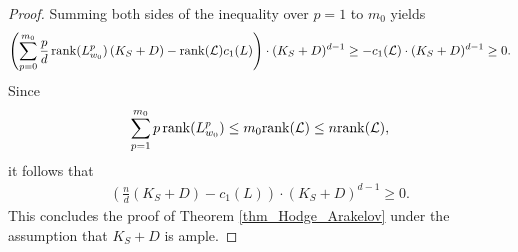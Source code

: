 \documentclass[11pt,letterpaper]{amsart}
\numberwithin{equation}{section}
\begin{document}
\begin{proof}
	Summing both sides of the inequality over $p = 1$ to $m_0$ yields  
	\begin{align*}  
		\left( \sum_{p=0}^{m_0} \frac{p}{d}\operatorname{rank}(L_{w_0}^p)\,(K_S + D) - {\rm rank}(\mathcal{L})c_1(L) \right) \cdot (K_S + D)^{d-1} \geq -c_1(\mathcal{L}) \cdot (K_S + D)^{d-1} \geq 0.  
	\end{align*}  
	Since $$\sum_{p=1}^{m_0} p\operatorname{rank}(L_{w_0}^p)\leq m_0{\rm rank}(\mathcal{L})\leq n{\rm rank}(\mathcal{L}),$$ it follows that  
	\begin{align*}  
		\left( \frac{n}{d}(K_S + D) - c_1(L) \right) \cdot (K_S + D)^{d-1} \geq 0.  
	\end{align*}  
	This concludes the proof of Theorem \ref{thm_Hodge_Arakelov} under the assumption that $K_S + D$ is ample.
\end{proof}
\end{document}
